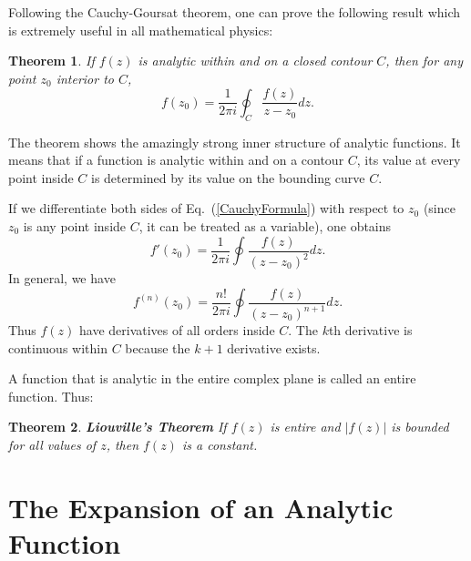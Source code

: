\documentclass[11pt, letterpaper]{article}
\newtheorem{thm}{Theorem}
\begin{document}
Following the Cauchy-Goursat theorem, one can prove the following result which is extremely useful in all mathematical physics:
\begin{thm}
If $f(z)$ is analytic within and on a closed contour $C$, then for any point $z_0$ interior to $C$,
\begin{equation}
	f(z_0) = \frac{1}{2\pi i}\oint_C \frac{f(z)}{z-z_0}dz. \label{CauchyFormula}
\end{equation}
\end{thm}
The theorem shows the amazingly strong inner structure of analytic functions. It means that if a function is analytic
within and on a contour $C$, its value at every point inside $C$ is determined by its value on the bounding curve $C$.

If we differentiate both sides of Eq.~(\ref{CauchyFormula}) with respect to $z_0$ (since $z_0$ is any point inside $C$,
it can be treated as a variable), one obtains
\begin{equation}
	f'(z_0) = \frac{1}{2\pi i}\oint \frac{f(z)}{(z-z_0)^2}dz.
\end{equation}
In general, we have
\begin{equation}
	f^{(n)}(z_0) = \frac{n!}{2\pi i}\oint \frac{f(z)}{(z-z_0)^{n+1}}dz.
\end{equation}
Thus $f(z)$ have derivatives of all orders inside $C$. The $k$th derivative is continuous within $C$ because the $k+1$
derivative exists.

A function that is analytic in the entire complex plane is called an entire function. Thus:
\begin{thm}
{\bf Liouville's Theorem} If $f(z)$ is entire and $|f(z)|$ is bounded for all values of $z$, then $f(z)$ is a constant.
\end{thm}


\section{The Expansion of an Analytic Function}
\end{document}

